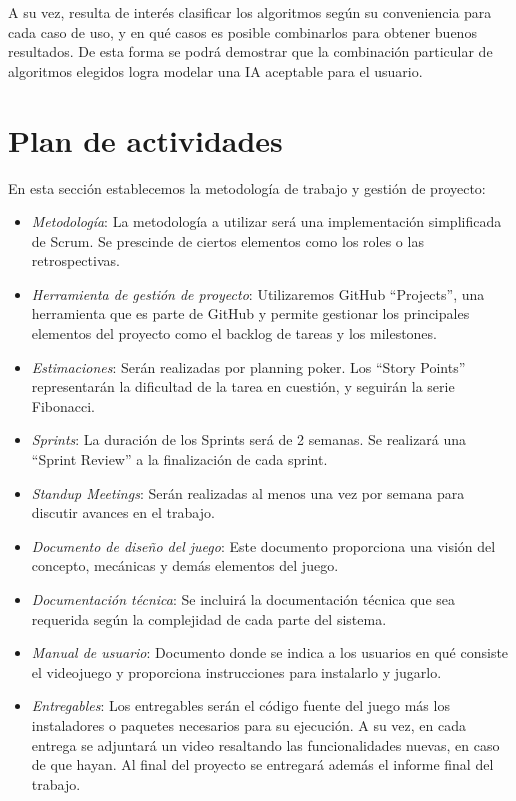 \documentclass[a4paper]{article}
\begin{document}
A su vez, resulta de interés clasificar los algoritmos según su conveniencia para cada caso de uso, y en qué casos es posible combinarlos para obtener buenos resultados. De esta forma se podrá demostrar que la combinación particular de algoritmos elegidos logra modelar una IA aceptable para el usuario.

\section{Plan de actividades}

En esta sección establecemos la metodología de trabajo y gestión de proyecto:

\begin{itemize}
    \item \textit{Metodología}: La metodología a utilizar será una implementación simplificada de Scrum. Se prescinde de ciertos elementos como los roles o las retrospectivas.
    \item \textit{Herramienta de gestión de proyecto}: Utilizaremos GitHub “Projects”, una herramienta que es parte de GitHub y permite gestionar los principales elementos del proyecto como el backlog de tareas y los milestones.
    \item \textit{Estimaciones}: Serán realizadas por planning poker. Los “Story Points” representarán la dificultad de la tarea en cuestión, y seguirán la serie Fibonacci.
    \item \textit{Sprints}: La duración de los Sprints será de 2 semanas. Se realizará una “Sprint Review” a la finalización de cada sprint.
    \item \textit{Standup Meetings}: Serán realizadas al menos una vez por semana para discutir avances en el trabajo.
    \item \textit{Documento de diseño del juego}: Este documento proporciona una visión del concepto, mecánicas y demás elementos del juego.
    \item \textit{Documentación técnica}: Se incluirá la documentación técnica que sea requerida según la complejidad de cada parte del sistema.
    \item \textit{Manual de usuario}: Documento donde se indica a los usuarios en qué consiste el videojuego y proporciona instrucciones para instalarlo y jugarlo.
    \item \textit{Entregables}: Los entregables serán el código fuente del juego más los instaladores o paquetes necesarios para su ejecución. A su vez, en cada entrega se adjuntará un video resaltando las funcionalidades nuevas, en caso de que hayan. Al final del proyecto se entregará además el informe final del trabajo.

\end{itemize}
\end{document}
